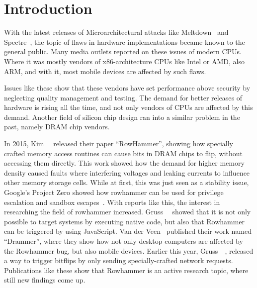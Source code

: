 \chapter{Introduction}\label{sec:intro}

With the latest releases of Microarchitectural attacks like
Meltdown~\cite{meltdown} and Spectre~\cite{spectre}, the topic of flaws in
hardware implementations became known to the general public. Many media outlets
reported on these issues of modern CPUs. Where it was mostly vendors of
x86-architecture CPUs like Intel or AMD, also ARM, and with it, most mobile
devices are affected by such flaws.

Issues like these show that these vendors have set performance above security by
neglecting quality management and testing. The demand for better releases of
hardware is rising all the time, and not only vendors of CPUs are affected by
this demand. Another field of silicon chip design ran into a similar problem in
the past, namely DRAM chip vendors.  

In 2015, Kim~\etal~\cite{rowhammergeneral} released their paper ``RowHammer'',
showing how specially crafted memory access routines can cause bits in DRAM
chips to flip, without accessing them directly. This work showed how the demand
for higher memory density caused faults where interfering voltages and leaking
currents to influence other memory storage cells. While at first, this was just
seen as a stability issue, Google's Project Zero showed how rowhammer can be
used for privilege escalation and sandbox escapes~\cite{projectzerorow}. With
reports like this, the interest in researching the field of rowhammer increased.
Gruss~\etal~\cite{rowhammerjs} showed that it is not only possible to target
systems by executing native code, but also that Rowhammer can be triggered by
using JavaScript. Van der Veen~\etal\cite{drammer} published their work named
``Drammer'', where they show how not only desktop computers are affected by the
Rowhammer bug, but also mobile devices. Earlier this year,
Gruss~\etal~\cite{nethammer}, released a way to trigger bitflips by only sending
specially-crafted network requests. Publications like these show that Rowhammer
is an active research topic, where still new findings come up. 


